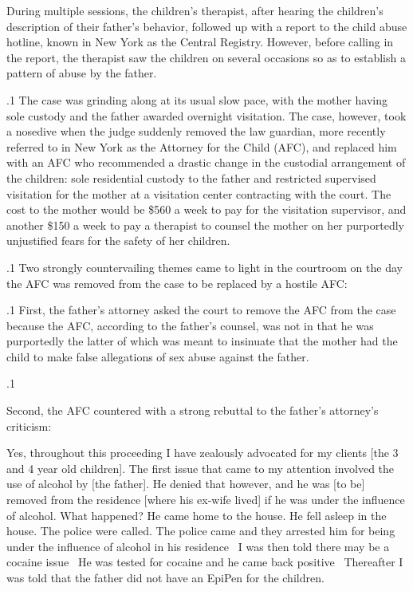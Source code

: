 \documentclass[11pt, twoside]{article}
\begin{document}
{{\nip{}%
During multiple sessions, the children’s therapist, after hearing the children’s description of their father’s behavior, followed up with a report to
the child abuse hotline, known in New York as the Central Registry.
However, before calling in the report, the therapist saw the children on
several occasions so as to establish a pattern of abuse by the father.
}%

\p.1{%
The case was grinding along at its usual slow pace, with the mother
having sole custody and the father awarded overnight visitation. The
case, however, took a nosedive when the judge suddenly removed the
law guardian, more recently referred to in New York as the Attorney
for the Child (AFC), and
replaced him with an AFC who recommended a drastic change in the custodial arrangement of the children: sole residential custody to
the father and restricted supervised visitation for the mother at a visitation center contracting with the court. The cost to the mother would be
\$560 a week to pay for the visitation supervisor, and another \$150 a week
to pay a therapist to counsel the mother on her purportedly unjustified
fears for the safety of her children.
}%

\p.1{%
Two strongly countervailing themes came to light in the courtroom
on the day the AFC was removed from the case to be replaced by a hostile
AFC:
}%

\p.1{%
First, the father’s attorney asked the court to remove the AFC
from the case because the AFC, according to the father’s counsel, was
not  in that he was purportedly
\mdash{}the latter of
which was meant to insinuate that the mother had  the child
to make false allegations of sex abuse against the father.
}%

\p.1{%
Second, the AFC countered with a strong rebuttal to the father’s
attorney’s criticism:

\begin{blockQuote}
Yes, throughout this proceeding I have zealously advocated for my
clients [the 3 and 4 year old children]. The first issue that came to
my attention involved the use of alcohol by [the father]. He denied that however, and he was [to be] removed from the residence
[where his ex-wife lived] if he was under the influence of alcohol.
What happened? He came home to the house. He fell asleep in the
house. The police were called. The police came and they arrested
him for being under the influence of alcohol in his residence \ellThree{2pt}{2pt}\
I was then told there may be a cocaine issue \ellThree{2pt}{2pt}\ He was tested for
cocaine and he came back positive \ellThree{2pt}{2pt}\ Thereafter I was told that the
father did not have an EpiPen for the children.\fnm{103}
\end{blockQuote}

}}
\end{document}
